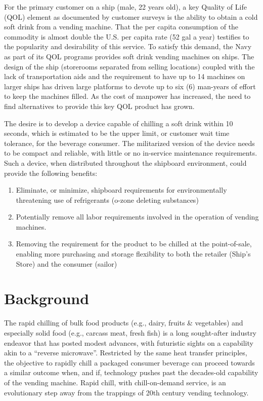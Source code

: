\documentclass[]{tufte-book}
\providecommand{\tightlist}{%
  \setlength{\itemsep}{0pt}\setlength{\parskip}{0pt}}
\begin{document}
For the primary customer on a ship (male, 22 years old), a key Quality of Life (QOL) element as documented by customer surveys is the ability to obtain a cold soft drink from a vending machine. That the per capita consumption of the commodity is almost double the U.S. per capita rate (52 gal a year) testifies to the popularity and desirability of this service. To satisfy this demand, the Navy as part of its QOL programs provides soft drink vending machines on ships. The design of the ship (storerooms separated from selling locations) coupled with the lack of transportation aids and the requirement to have up to 14 machines on larger ships has driven large platforms to devote up to six (6) man-years of effort to keep the machines filled. As the cost of manpower has increased, the need to find alternatives to provide this key QOL product has grown.

The desire is to develop a device capable of chilling a soft drink within 10 seconds, which is estimated to be the upper limit, or customer wait time tolerance, for the beverage consumer. The militarized version of the device needs to be compact and reliable, with little or no in-service maintenance requirements. Such a device, when distributed throughout the shipboard environment, could provide the following benefits:

\begin{enumerate}
\def\labelenumi{\arabic{enumi}.}
\tightlist
\item
  Eliminate, or minimize, shipboard requirements for environmentally threatening use of refrigerants (o-zone deleting substances)\\
\item
  Potentially remove all labor requirements involved in the operation of vending machines.\\
\item
  Removing the requirement for the product to be chilled at the point-of-sale, enabling more purchasing and storage flexibility to both the retailer (Ship's Store) and the consumer (sailor)
\end{enumerate}

\hypertarget{background}{%
\section{Background}\label{background}}

The rapid chilling of bulk food products (e.g., dairy, fruits \& vegetables) and especially solid food (e.g., carcass meat, fresh fish) is a long sought-after industry endeavor that has posted modest advances, with futuristic sights on a capability akin to a ``reverse microwave''. Restricted by the same heat transfer principles, the objective to rapidly chill a packaged consumer beverage can proceed towards a similar outcome when, and if, technology pushes past the decades-old capability of the vending machine. Rapid chill, with chill-on-demand service, is an evolutionary step away from the trappings of 20th century vending technology.
\end{document}
